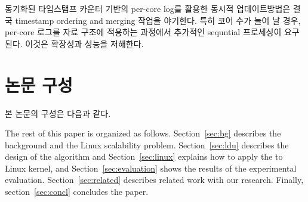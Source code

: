 
동기화된 타임스탬프 카운터 기반의 per-core log를 활용한 동시적 업데이트방법은 결국 timestamp ordering and
merging 작업을 야기한다.
특히 코어 수가 늘어 날 경우, per-core 로그를 자료 구조에 적용하는 과정에서 추가적인 sequntial 프로세싱이 요구된다.
이것은 확장성과 성능을 저해한다. 

\newpage
\section{논문 구성} \label{sec:intro}
본 논문의 구성은 다음과 같다.

The rest of this paper is organized as follows.
Section~\ref{sec:bg} describes the background and the Linux scalability problem.
Section~\ref{sec:ldu} describes the design of the \LDU algorithm and 
Section~\ref{sec:linux} explains how to apply the \LDU to Linux kernel, and
Section~\ref{sec:evaluation} shows the results of the experimental evaluation. 
Section~\ref{sec:related} describes related work with our research.
Finally, section~\ref{sec:concl} concludes the paper.
